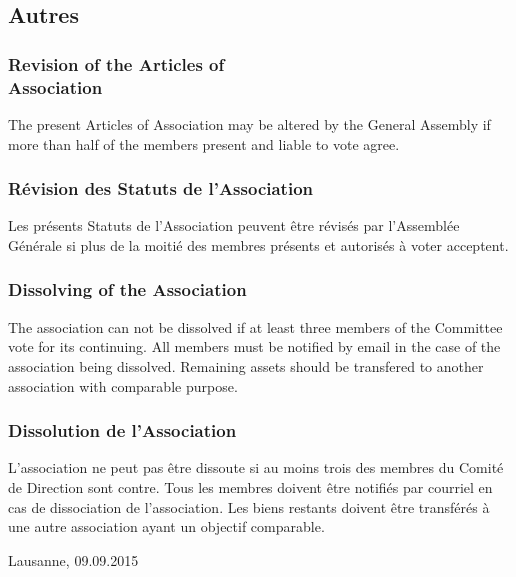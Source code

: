 \documentclass[12pt,a4paper,oneside]{article}
\newcounter{art}
\newcommand{\english}{    \switchcolumn[0]\noindent}
\newcommand{\french}{    \switchcolumn[1]\noindent}
\begin{document}
\begin{paracol}{2}
\french
	\subsection{Autres}

	\english
	\subsubsection{Revision of the Articles of \\ Association}\stepcounter{art}
	The present Articles of Association may be altered by the General Assembly if more than half of the members present and liable to vote agree. 		
	\vspace{0.5cm}


	\french
	\subsubsection{Révision des Statuts de l’Association}\stepcounter{art}
	Les présents Statuts de l’Association peuvent être révisés par l’Assemblée Générale si plus de la moitié des membres présents et autorisés à voter acceptent.


	\english
	\subsubsection{Dissolving of the Association}\stepcounter{art}
	The association can not be dissolved if at least three members of the Committee vote for its continuing.
	All members must be notified by email in the case of the association being dissolved.
	Remaining assets should be transfered to another association with comparable purpose.


	\french
	\subsubsection{Dissolution de l’Association}\stepcounter{art}
	L’association ne peut pas être dissoute si au moins trois des membres du Comité de Direction sont contre. Tous les membres doivent être notifiés par courriel en cas de dissociation de l’association. Les biens restants doivent être transférés à une autre association ayant un objectif comparable.


\english
	\vspace{\fill}
	
	\noindent
	Lausanne, 09.09.2015
	\vspace {1.5cm}

	\noindent
	\hrulefill \\
 
	\vspace {1.0cm}
 	\noindent 
 	\hrulefill \\
 	

 	

	
	

\clearpage

% 



\end{paracol}
\end{document}
